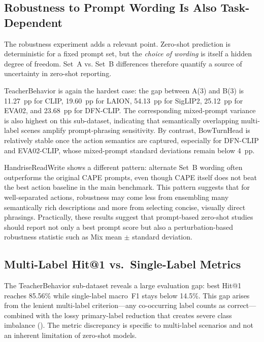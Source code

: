 \documentclass[electronics,article,submit,pdftex,moreauthors]{Definitions/mdpi}
\begin{document}
\subsection{Robustness to Prompt Wording Is Also Task-Dependent}

The robustness experiment adds a relevant point. Zero-shot prediction is deterministic for a fixed prompt set, but the \emph{choice of wording} is itself a hidden degree of freedom. Set~A vs. Set~B differences therefore quantify a source of uncertainty in zero-shot reporting.

TeacherBehavior is again the hardest case: the gap between A(3) and B(3) is 11.27~pp for CLIP, 19.60~pp for LAION, 54.13~pp for SigLIP2, 25.12~pp for EVA02, and 23.68~pp for DFN-CLIP. The corresponding mixed-prompt variance is also highest on this sub-dataset, indicating that semantically overlapping multi-label scenes amplify prompt-phrasing sensitivity. By contrast, BowTurnHead is relatively stable once the action semantics are captured, especially for DFN-CLIP and EVA02-CLIP, whose mixed-prompt standard deviations remain below 4~pp.

HandriseReadWrite shows a different pattern: alternate Set~B wording often outperforms the original CAPE prompts, even though CAPE itself does not beat the best action baseline in the main benchmark. This pattern suggests that for well-separated actions, robustness may come less from ensembling many semantically rich descriptions and more from selecting concise, visually direct phrasings. Practically, these results suggest that prompt-based zero-shot studies should report not only a best prompt score but also a perturbation-based robustness statistic such as Mix mean $\pm$ standard deviation.

\subsection{Multi-Label Hit@1 vs.\ Single-Label Metrics}
\label{sec:metric_gap}

The TeacherBehavior sub-dataset reveals a large evaluation gap: best Hit@1 reaches 85.56\% while single-label macro~F1 stays below 14.5\%.
This gap arises from the lenient multi-label criterion---any co-occurring label counts as correct---combined with the lossy primary-label reduction that creates severe class imbalance (). The metric discrepancy is specific to multi-label scenarios and not an inherent limitation of zero-shot models.
\end{document}
